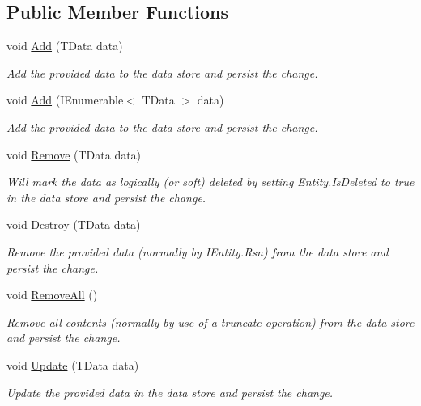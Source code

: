 \subsection*{Public Member Functions}
\begin{DoxyCompactItemize}
\item 
void \hyperlink{interfaceCqrs_1_1DataStores_1_1IDataStore_a114404daaf37fec9cc5547cd9a17858c_a114404daaf37fec9cc5547cd9a17858c}{Add} (T\+Data data)
\begin{DoxyCompactList}\small\item\em Add the provided {\itshape data}  to the data store and persist the change. \end{DoxyCompactList}\item 
void \hyperlink{interfaceCqrs_1_1DataStores_1_1IDataStore_a906f3f2f80db7a549a4170eca4653e26_a906f3f2f80db7a549a4170eca4653e26}{Add} (I\+Enumerable$<$ T\+Data $>$ data)
\begin{DoxyCompactList}\small\item\em Add the provided {\itshape data}  to the data store and persist the change. \end{DoxyCompactList}\item 
void \hyperlink{interfaceCqrs_1_1DataStores_1_1IDataStore_a7ef540796bbe4257296841590bc23478_a7ef540796bbe4257296841590bc23478}{Remove} (T\+Data data)
\begin{DoxyCompactList}\small\item\em Will mark the {\itshape data}  as logically (or soft) deleted by setting Entity.\+Is\+Deleted to true in the data store and persist the change. \end{DoxyCompactList}\item 
void \hyperlink{interfaceCqrs_1_1DataStores_1_1IDataStore_aa7ade96f2f3151d5353cf7bdbb2baec5_aa7ade96f2f3151d5353cf7bdbb2baec5}{Destroy} (T\+Data data)
\begin{DoxyCompactList}\small\item\em Remove the provided {\itshape data}  (normally by I\+Entity.\+Rsn) from the data store and persist the change. \end{DoxyCompactList}\item 
void \hyperlink{interfaceCqrs_1_1DataStores_1_1IDataStore_aead8d7a39a717d29af05daf7b64bea94_aead8d7a39a717d29af05daf7b64bea94}{Remove\+All} ()
\begin{DoxyCompactList}\small\item\em Remove all contents (normally by use of a truncate operation) from the data store and persist the change. \end{DoxyCompactList}\item 
void \hyperlink{interfaceCqrs_1_1DataStores_1_1IDataStore_a6d5d4dd572de8db01ff0c48d37faefa7_a6d5d4dd572de8db01ff0c48d37faefa7}{Update} (T\+Data data)
\begin{DoxyCompactList}\small\item\em Update the provided {\itshape data}  in the data store and persist the change. \end{DoxyCompactList}\end{DoxyCompactItemize}


